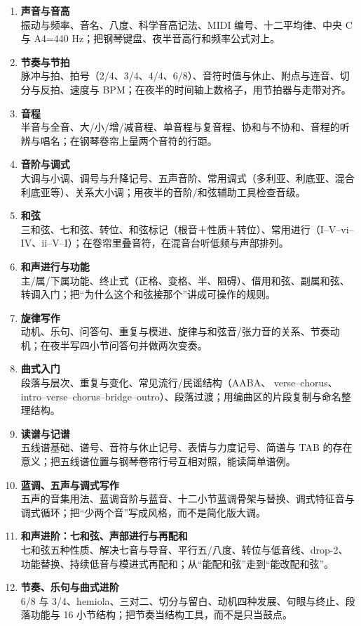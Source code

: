 \begin{enumerate}[label=\textbf{第 \arabic* 章}]
  \item \textbf{声音与音高}\\
  振动与频率、音名、八度、科学音高记法、MIDI 编号、十二平均律、中央 C 与 A4=440 Hz；把钢琴键盘、夜半音高行和频率公式对上。
  \item \textbf{节奏与节拍}\\
  脉冲与拍、拍号（2/4、3/4、4/4、6/8）、音符时值与休止、附点与连音、切分与反拍、速度与 BPM；在夜半的时间轴上数格子，用节拍器与走带对齐。
  \item \textbf{音程}\\
  半音与全音、大/小/增/减音程、单音程与复音程、协和与不协和、音程的听辨与唱名；在钢琴卷帘上量两个音符的行距。
  \item \textbf{音阶与调式}\\
  大调与小调、调号与升降记号、五声音阶、常用调式（多利亚、利底亚、混合利底亚等）、关系大小调；用夜半的音阶/和弦辅助工具检查音级。
  \item \textbf{和弦}\\
  三和弦、七和弦、转位、和弦标记（根音＋性质＋转位）、常用进行（I–V–vi–IV、ii–V–I）；在卷帘里叠音符，在混音台听低频与声部排列。
  \item \textbf{和声进行与功能}\\
  主/属/下属功能、终止式（正格、变格、半、阻碍）、借用和弦、副属和弦、转调入门；把“为什么这个和弦接那个”讲成可操作的规则。
  \item \textbf{旋律写作}\\
  动机、乐句、问答句、重复与模进、旋律与和弦音/张力音的关系、节奏动机；在夜半写四小节问答句并做两次变奏。
  \item \textbf{曲式入门}\\
  段落与层次、重复与变化、常见流行/民谣结构（AABA、 verse–chorus、intro–verse–chorus–bridge–outro）、段落过渡；用编曲区的片段复制与命名整理结构。
  \item \textbf{读谱与记谱}\\
  五线谱基础、谱号、音符与休止记号、表情与力度记号、简谱与 TAB 的存在意义；把五线谱位置与钢琴卷帘行号互相对照，能读简单谱例。
  \item \textbf{蓝调、五声与调式写作}\\
  五声的音集用法、蓝调音阶与蓝音、十二小节蓝调骨架与替换、调式特征音与调式循环；把“少两个音”写成风格，而不是简化版大调。
  \item \textbf{和声进阶：七和弦、声部进行与再配和}\\
  七和弦五种性质、解决七音与导音、平行五/八度、转位与低音线、drop-2、功能替换、持续低音与模进式再配和；从“能配和弦”走到“能改配和弦”。
  \item \textbf{节奏、乐句与曲式进阶}\\
  6/8 与 3/4、hemiola、三对二、切分与留白、动机四种发展、句眼与终止、段落功能与 16 小节结构；把节奏当结构工具，而不是只当鼓点。
\end{enumerate}

